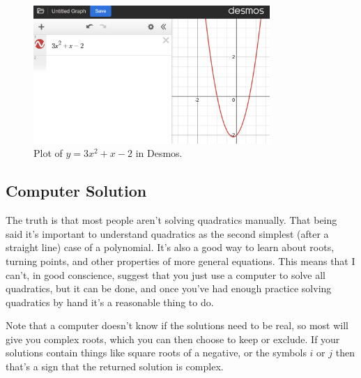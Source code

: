 \documentclass[fleqn]{LectureClass/LectureClass}
\begin{document}
    \begin{figure}
        \centering
        \includegraphics[width=0.8\textwidth]{images/desmos-quadratic-plot}
        \caption{Plot of \(y = 3x^2 + x - 2\) in Desmos.}
        \label{fig:desmos parabola}
    \end{figure}
    
    \subsection{Computer Solution}
    The truth is that most people aren't solving quadratics manually.
    That being said it's important to understand quadratics as the second simplest (after a straight line) case of a polynomial.
    It's also a good way to learn about roots, turning points, and other properties of more general equations.
    This means that I can't, in good conscience, suggest that you just use a computer to solve all quadratics, but it can be done, and once you've had enough practice solving quadratics by hand it's a reasonable thing to do.
    
    Note that a computer doesn't know if the solutions need to be real, so most will give you complex roots, which you can then choose to keep or exclude.
    If your solutions contain things like square roots of a negative, or the symbols \(i\) or \(j\) then that's a sign that the returned solution is complex.
    
\end{document}
